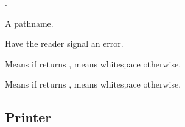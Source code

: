 \begin{LIST}{1cm}
  {
  \index{\#\#}%
  .
  }

  {
  A pathname.
  }

  \IT{\KWD{\#\boldmath$<$}}
  {
  Have the reader signal an error.
  }

  {
  Means  if  returns \T, means whitespace
  otherwise. 
  }

  {
  Means  if  returns \NIL, means whitespace
  otherwise. 
  }

\end{LIST}


\subsection{Printer} 



